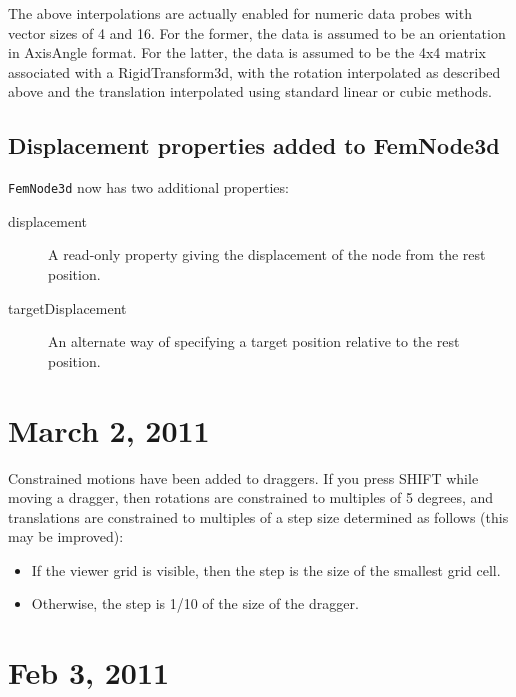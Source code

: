 \documentclass{article}
\begin{document}
\begin{sideblock}
The above interpolations are actually enabled for numeric data
probes with vector sizes of 4 and 16. For the former, the data
is assumed to be an orientation in AxisAngle format. For the
latter, the data is assumed to be the 4x4 matrix associated with
a RigidTransform3d, with the rotation interpolated as
described above and the translation interpolated using standard
linear or cubic methods.
\end{sideblock}

\subsection*{Displacement properties added to FemNode3d}

{\tt FemNode3d} now has two additional properties:

\begin{description}

\item[displacement] \mbox{}
A read-only property giving the displacement of the node from the
rest position.

\item[targetDisplacement] \mbox{}
An alternate way of specifying a target position relative to
the rest position.

\end{description}

\section*{March 2, 2011}

Constrained motions have been added to draggers. If you press SHIFT
while moving a dragger, then rotations are constrained to multiples of
5 degrees, and translations are constrained to multiples of a step
size determined as follows (this may be improved):

\begin{itemize}

\item If the viewer grid is visible, then the step is the size of the
smallest grid cell.

\item Otherwise, the step is 1/10 of the size of the dragger.

\end{itemize}

\section*{Feb 3, 2011}
\end{document}
